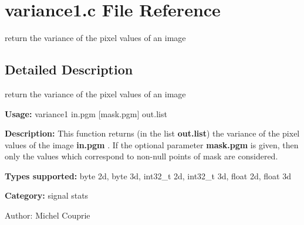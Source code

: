 \section{variance1.c File Reference}
\label{variance1_8c}
return the variance of the pixel values of an image  




\label{_details}
\subsection{Detailed Description}
return the variance of the pixel values of an image 

{\bf Usage:} variance1 in.pgm [mask.pgm] out.list

{\bf Description:} This function returns (in the list {\bf out.list}) the variance of the pixel values of the image {\bf in.pgm} . If the optional parameter {\bf mask.pgm} is given, then only the values which correspond to non-null points of mask are considered.

{\bf Types supported:} byte 2d, byte 3d, int32\_\-t 2d, int32\_\-t 3d, float 2d, float 3d

{\bf Category:} signal stats

\begin{Desc}
\item[Author:]Michel Couprie \end{Desc}
